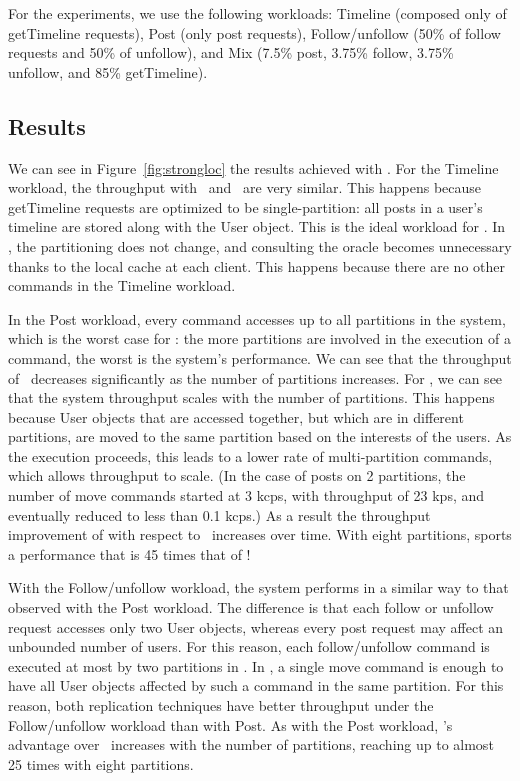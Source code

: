 For the experiments, we use the following workloads: Timeline (composed only of
getTimeline requests), Post (only post requests), Follow/unfollow (50\% of
follow requests and 50\% of unfollow), and Mix (7.5\% post, 3.75\% follow,
3.75\% unfollow, and 85\% getTimeline).

\subsection{Results }
\label{sec:dssmr-evaluation:strongloc}


We can see in Figure~\ref{fig:strongloc}
the results achieved with \dssmrappname{}.
For the Timeline workload, the throughput with \dssmr\ and \ssmr\ are very
similar. This happens because getTimeline requests are optimized to be
single-partition: all posts in a user's timeline are stored along with the User
object.
This is the ideal workload for \ssmr{}. In \dssmr{}, the partitioning does not
change, and consulting the oracle becomes unnecessary thanks to the local cache
at each client. This happens because there are no other commands in the Timeline
workload.

In the Post workload, every command accesses up to all partitions in the system,
which is the worst case for \ssmr{}: the more partitions are involved in the
execution of a command, the worst is the system's performance. We can see that
the throughput of \ssmr\ decreases significantly as the number of partitions
increases. For \dssmr{}, we can see that the system throughput scales with the
number of partitions. This happens because User objects that are accessed
together, but which are in different partitions, are moved to the same partition
based on the interests of the users. As the execution proceeds, this leads to a
lower rate of multi-partition commands, which allows throughput to scale. (In
the case of posts on 2 partitions, the number of move commands started at 3
kcps, with throughput of 23 kps, and eventually reduced to less than 0.1 kcps.)
As a result the throughput improvement of \dssmr{} with respect to \ssmr\
increases over time. With eight partitions, \dssmr{} sports a performance that
is 45 times that of \ssmr!

With the Follow/unfollow workload, the system performs in a similar way to that
observed with the Post workload. The difference is that each follow or unfollow
request accesses only two User objects, whereas every post request may affect an
unbounded number of users. For this reason, each follow/unfollow command is
executed at most by two partitions in \ssmr{}. In \dssmr{}, a single move
command is enough to have all User objects affected by such a command in the
same partition. For this reason, both replication techniques have better
throughput under the Follow/unfollow workload than with Post. As with the Post
workload, \dssmr{}'s advantage over \ssmr\ increases with the number of
partitions, reaching up to almost 25 times with eight partitions.


